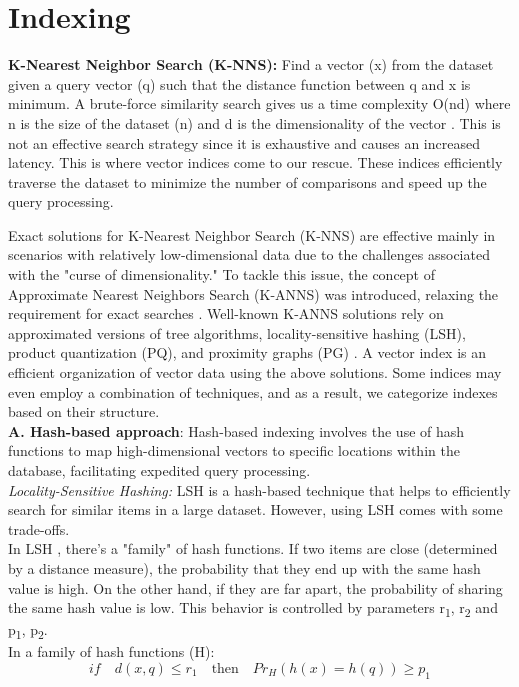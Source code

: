 \documentclass[conference]{IEEEtran}
\begin{document}
\section{Indexing}
\textbf{K-Nearest Neighbor Search (K-NNS):} Find a vector (x) from the dataset given a query vector (q) such that the distance function between q and x is minimum. A brute-force similarity search gives us a time complexity O(nd) where n is the size of the dataset (n) and d is the dimensionality of the vector \cite{milvus, manu}. This is not an effective search strategy since it is exhaustive and causes an increased latency. This is where vector indices come to our rescue. These indices efficiently traverse the dataset to minimize the number of comparisons and speed up the query processing.

Exact solutions for K-Nearest Neighbor Search (K-NNS) are effective mainly in scenarios with relatively low-dimensional data due to the challenges associated with the "curse of dimensionality." To tackle this issue, the concept of Approximate Nearest Neighbors Search (K-ANNS) was introduced, relaxing the requirement for exact searches \cite{r3}. Well-known K-ANNS solutions rely on approximated versions of tree algorithms, locality-sensitive hashing (LSH), product quantization (PQ), and proximity graphs (PG) . A vector index is an efficient organization of vector data using the above solutions. Some indices may even employ a combination of techniques, and as a result, we categorize indexes based on their structure.
\\
\textbf{A. Hash-based approach}: Hash-based indexing involves the use of hash functions to map high-dimensional vectors to specific locations within the database, facilitating expedited query processing. 
\\
\textit{Locality-Sensitive Hashing:}
LSH is a hash-based technique that helps to efficiently search for similar items in a large dataset. However, using LSH comes with some trade-offs.
\\
In LSH \cite{r4,ref1}, there's a "family" of hash functions. If two items are close (determined by a distance measure), the probability that they end up with the same hash value is high. On the other hand, if they are far apart, the probability of sharing the same hash value is low. This behavior is controlled by parameters r\textsubscript{1}, r\textsubscript{2} and p\textsubscript{1}, p\textsubscript{2}.
\\
In a family of hash functions (H): \[if \quad d(x,q) \leq r_1 \quad \textrm{then} \quad Pr_H(h(x) = h(q)) \geq p_1\]
\end{document}
